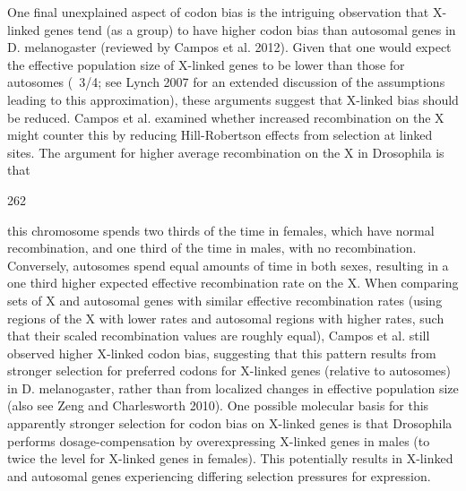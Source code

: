 \documentclass{article}
\begin{document}
One final unexplained aspect of codon bias is the intriguing observation that X-linked genes tend (as a group) to have higher codon bias than autosomal genes in D. melanogaster (reviewed by Campos et al. 2012). Given that one would expect the effective population size of X-linked genes to be lower than those for autosomes (~3/4; see Lynch 2007 for an extended discussion of the assumptions leading to this approximation), these arguments suggest that X-linked bias should be reduced. Campos et al. examined whether increased recombination on the X might counter this by reducing Hill-Robertson effects from selection at linked sites. The argument for higher average recombination on the X in Drosophila is that

262

this chromosome spends two thirds of the time in females, which have normal recombination, and one third of the time in males, with no recombination. Conversely, autosomes spend equal amounts of time in both sexes, resulting in a one third higher expected effective recombination rate on the X. When comparing sets of X and autosomal genes with similar effective recombination rates (using regions of the X with lower rates and autosomal regions with higher rates, such that their scaled recombination values are roughly equal), Campos et al. still observed higher X-linked codon bias, suggesting that this pattern results from stronger selection for preferred codons for X-linked genes (relative to autosomes) in D. melanogaster, rather than from localized changes in effective population size (also see Zeng and Charlesworth 2010). One possible molecular basis for this apparently stronger selection for codon bias on X-linked genes is that Drosophila performs dosage-compensation by overexpressing X-linked genes in males (to twice the level for X-linked genes in females). This potentially results in X-linked and autosomal genes experiencing differing selection pressures for expression.
\end{document}
